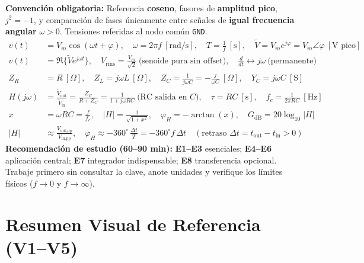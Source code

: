 \documentclass[11pt, a4paper]{article}
\newcommand{\phasor}[1]{\widetilde{#1}}
\begin{document}
\vspace{0.2cm}
\begin{tcolorbox}[colback=gray!5, colframe=ucbblue, title=\textbf{Formulario Común de Estudio y Convención Uniforme}]
\small
\textbf{Convención obligatoria:} Referencia \textbf{coseno}, fasores de \textbf{amplitud pico}, $j^2 = -1$, y comparación de fases únicamente entre señales de \textbf{igual frecuencia angular} $\omega > 0$. Tensiones referidas al nodo común \texttt{GND}.
\begin{align*}
    v(t) &= V_m \cos(\omega t + \varphi), \quad \omega = 2\pi f\ [\text{rad/s}], \quad T = \frac{1}{f}\ [\text{s}], \quad \phasor{V} = V_m e^{j\varphi} = V_m\angle\varphi\ [\text{V pico}] \\
    v(t) &= \Re\{\phasor{V} e^{j\omega t}\}, \quad V_{\text{rms}} = \frac{V_m}{\sqrt{2}}\ \text{(senoide pura sin offset)}, \quad \frac{d}{dt} \longleftrightarrow j\omega\ \text{(permanente)} \\
    Z_R &= R\ [\Omega], \quad Z_L = j\omega L\ [\Omega], \quad Z_C = \frac{1}{j\omega C} = -\frac{j}{\omega C}\ [\Omega], \quad Y_C = j\omega C\ [\text{S}] \\
    H(j\omega) &= \frac{\phasor{V}_{\text{out}}}{\phasor{V}_{\text{in}}} = \frac{Z_C}{R + Z_C} = \frac{1}{1 + j\omega RC}\ \text{(RC salida en } C\text{)}, \quad \tau = RC\ [\text{s}], \quad f_c = \frac{1}{2\pi RC}\ [\text{Hz}] \\
    x &= \omega RC = \frac{f}{f_c}, \quad |H| = \frac{1}{\sqrt{1 + x^2}}, \quad \varphi_H = -\arctan(x), \quad G_{\text{dB}} = 20\log_{10}|H| \\
    |H| &\approx \frac{V_{\text{out,pp}}}{V_{\text{in,pp}}}, \quad \varphi_H \approx -360^\circ\,\frac{\Delta t}{T} = -360^\circ f\,\Delta t \quad (\text{retraso } \Delta t = t_{\text{out}} - t_{\text{in}} > 0)
\end{align*}
\textbf{Recomendación de estudio (60--90 min):} \textbf{E1--E3} esenciales; \textbf{E4--E6} aplicación central; \textbf{E7} integrador indispensable; \textbf{E8} transferencia opcional. Trabaje primero sin consultar la clave, anote unidades y verifique los límites físicos ($f\to 0$ y $f\to\infty$).
\end{tcolorbox}

\section*{Resumen Visual de Referencia (V1--V5)}
\end{document}
